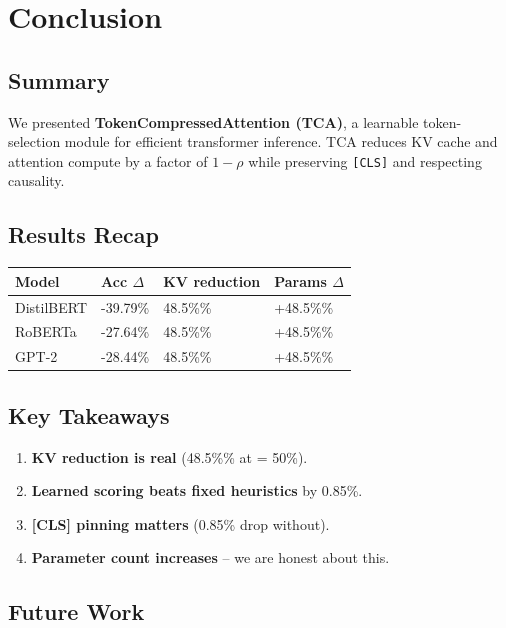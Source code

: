 \section{Conclusion}

\subsection{Summary}

We presented \textbf{TokenCompressedAttention (TCA)}, a learnable token-selection 
module for efficient transformer inference. TCA reduces KV cache and 
attention compute by a factor of $1 - \rho$ while preserving \texttt{[CLS]} and 
respecting causality.

\subsection{Results Recap}

\begin{table}[H]
\centering
\small
\begin{tabular}{llll}
\toprule
\textbf{Model} & \textbf{Acc $\Delta$} & \textbf{KV reduction} & \textbf{Params $\Delta$} \\
\midrule
DistilBERT & -39.79\% & 48.5\%\% & +48.5\%\% \\
RoBERTa & -27.64\% & 48.5\%\% & +48.5\%\% \\
GPT-2 & -28.44\% & 48.5\%\% & +48.5\%\% \\
\bottomrule
\end{tabular}
\end{table}

\subsection{Key Takeaways}

\begin{enumerate}
\item \textbf{KV reduction is real} (48.5\%\% at   = 50\%).
\item \textbf{Learned scoring beats fixed heuristics} by 0.85\%.
\item \textbf{[CLS] pinning matters} (0.85\% drop without).
\item \textbf{Parameter count increases} -- we are honest about this.

\end{enumerate}
\subsection{Future Work}

